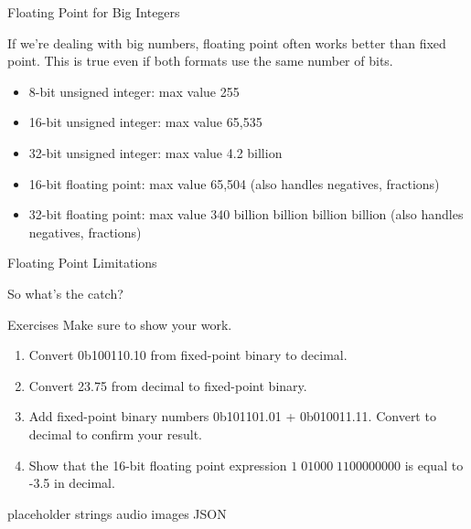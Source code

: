 \begin{frame}{Floating Point for Big Integers}

    If we're dealing with big numbers, floating point often works better than fixed
    point. This is true even if both formats use the same number of bits.

    \begin{itemize}
        \item 8-bit unsigned integer: max value 255
        \item 16-bit unsigned integer: max value 65,535
        \item 32-bit unsigned integer: max value 4.2 billion %
        \item 16-bit floating point: max value 65,504 (also handles negatives, fractions)
        \item 32-bit floating point: max value 340 billion billion billion billion (also handles negatives, fractions)
    \end{itemize}

\end{frame}

\begin{frame}{Floating Point Limitations}

    So what's the catch?

\end{frame}

\begin{frame}{Exercises}
    Make sure to show your work.
    \begin{enumerate}
        \item Convert 0b100110.10 from fixed-point binary to decimal.
        \item Convert 23.75 from decimal to fixed-point binary.
        \item Add fixed-point binary numbers 0b101101.01 + 0b010011.11. Convert to decimal to
              confirm your result.
        \item Show that the 16-bit floating point expression ${1 \; 01000 \; 1100000000}$ is
              equal to -3.5 in decimal.
    \end{enumerate}
\end{frame}


\begin{frame}{placeholder}
    strings
    audio
    images
    JSON
\end{frame}

